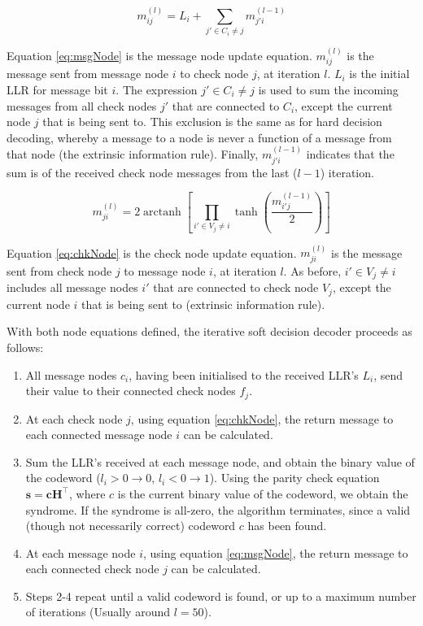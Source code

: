 \documentclass[11pt]{article}
\numberwithin{equation}{subsection}
\DeclareMathOperator\arctanh{arctanh}
\begin{document}
\begin{equation} \label{eq:msgNode}
m_{ij}^{(l)} = L_i+\sum\limits_{j'\in C_i \ne j}m_{j'i}^{(l-1)}
\end{equation}

Equation \ref{eq:msgNode} is the message node update equation. $m_{ij}^{(l)}$ is the message sent from message node $i$ to check node $j$, at iteration $l$. $L_i$ is the initial LLR for message bit $i$. The expression $j'\in C_i \ne j$ is used to sum the incoming messages from all check nodes $j'$ that are connected to $C_i$, except the current node $j$ that is being sent to. This exclusion is the same as for hard decision decoding, whereby a message to a node is never a function of a message from that node (the extrinsic information rule). Finally, $m_{j'i}^{(l-1)}$ indicates that the sum is of the received check node messages from the last ($l-1$) iteration.

\begin{equation} \label{eq:chkNode}
m_{ji}^{(l)} = 2\arctanh\left[\prod\limits_{i'\in V_j\ne i} \tanh(\dfrac{m_{i'j}^{(l-1)}}{2})\right]
\end{equation}

Equation \ref{eq:chkNode} is the check node update equation. $m_{ji}^{(l)}$ is the message sent from check node $j$ to message node $i$, at iteration $l$. As before, $i'\in V_j\ne i$ includes all message nodes $i'$ that are connected to check node $V_j$, except the current node $i$ that is being sent to (extrinsic information rule).

\noindent With both node equations defined, the iterative soft decision decoder proceeds as follows:

\begin{enumerate}
\item All message nodes $c_i$, having been initialised to the received LLR's $L_i$, send their value to their connected check nodes $f_j$. 
\item At each check node $j$, using equation \ref{eq:chkNode}, the return message to each connected message node $i$ can be calculated.
\item Sum the LLR's received at each message node, and obtain the binary value of the codeword ($l_i > 0 \rightarrow 0$, $l_i < 0 \rightarrow 1$). Using the parity check equation $\mathbf{s=c H}^\top$, where $c$ is the current binary value of the codeword, we obtain the syndrome. If the syndrome is all-zero, the algorithm terminates, since a valid (though not necessarily correct) codeword $c$ has been found.
\item At each message node $i$, using equation \ref{eq:msgNode}, the return message to each connected check node $j$ can be calculated.
\item Steps 2-4 repeat until a valid codeword is found, or up to a maximum number of iterations (Usually around $l=50$). 
\end{enumerate}
\end{document}
